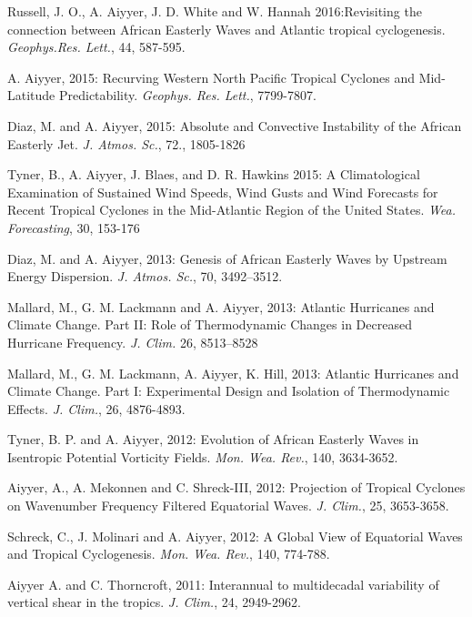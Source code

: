 \begin{ilist}
\item Russell, J. O., A. Aiyyer, J. D. White and W. Hannah 2016:Revisiting the connection between African Easterly Waves and Atlantic tropical cyclogenesis.  \emph{Geophys.Res. Lett.}, 44, 587-595.

\item A. Aiyyer, 2015: Recurving Western North Pacific Tropical Cyclones and Mid-Latitude Predictability. \emph{Geophys. Res. Lett.}, 7799-7807.

\item Diaz, M. and A. Aiyyer, 2015: Absolute and Convective Instability of the African Easterly Jet. \emph{J. Atmos. Sc.}, 72., 1805-1826
  
\item Tyner, B., A. Aiyyer, J. Blaes, and D. R. Hawkins 2015: A Climatological Examination of
Sustained Wind Speeds, Wind Gusts and Wind Forecasts for Recent Tropical Cyclones in the
Mid-Atlantic Region of the United States. \emph{Wea. Forecasting}, 30, 153-176


\item Diaz, M. and A. Aiyyer, 2013: Genesis of African Easterly Waves by Upstream Energy Dispersion. \emph{J. Atmos. Sc.}, 70, 3492–3512. 

\item Mallard, M., G. M. Lackmann and A. Aiyyer, 2013: Atlantic Hurricanes and Climate Change. Part II: Role of Thermodynamic Changes in Decreased Hurricane Frequency. \emph{J. Clim.} 26, 8513–8528

\item Mallard, M., G. M. Lackmann, A. Aiyyer, K. Hill, 2013: Atlantic Hurricanes and Climate Change. Part I: Experimental Design and Isolation of Thermodynamic Effects. \emph{J. Clim.}, 26, 4876-4893.

\item Tyner, B. P. and A. Aiyyer, 2012: Evolution of African Easterly Waves in Isentropic Potential Vorticity Fields. \emph{Mon. Wea. Rev.}, 140, 3634-3652.

\item Aiyyer, A., A. Mekonnen and C. Shreck-III, 2012: Projection of Tropical Cyclones on Wavenumber Frequency Filtered Equatorial Waves. \emph{J. Clim.}, 25, 3653-3658.

\item Schreck, C., J. Molinari and A. Aiyyer, 2012: A Global View of Equatorial Waves and Tropical Cyclogenesis. \emph{Mon. Wea. Rev.}, 140, 774-788.


\item Aiyyer A. and C. Thorncroft, 2011: Interannual to multidecadal variability of vertical shear in the tropics. \emph{J. Clim.}, 24, 2949-2962.


\end{ilist}

